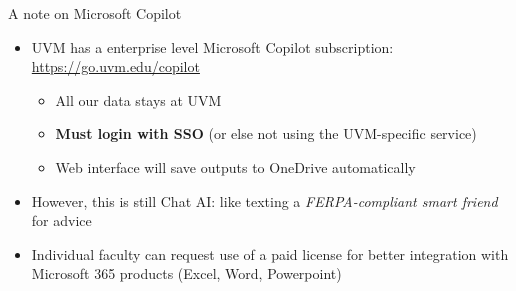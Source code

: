 \documentclass[aspectratio=169, 10pt]{beamer}
\begin{document}
\begin{frame}{A note on Microsoft Copilot}

\begin{itemize} 
\item UVM has a enterprise level Microsoft Copilot subscription: \href{https://go.uvm.edu/copilot}{https://go.uvm.edu/copilot }
\begin{itemize} 
	\item All our data stays at UVM 
	\item \textbf{Must login with SSO} (or else not using the UVM-specific service)
	\item Web interface will save outputs to OneDrive automatically 
\end{itemize}
	\item However, this is still Chat AI: like texting a \textit{FERPA-compliant smart friend} for advice 

\item Individual faculty can request use of a paid license for better integration with Microsoft 365 products (Excel, Word, Powerpoint)
\end{itemize} 
\end{frame}
\end{document}
